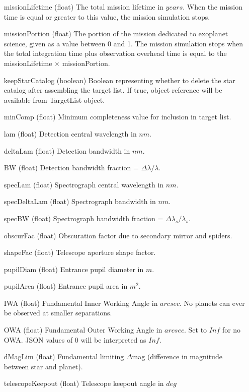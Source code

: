 \documentclass[cleanfoot]{asme2ej}
\begin{document}
\begin{itemize}[leftmargin=1in,font={\ttfamily}]
\item[missionLifetime] (float) The total mission lifetime in $ years $.  When the mission time is equal or greater to this value, the mission simulation stops.
\item[missionPortion] (float) The portion of the mission dedicated to exoplanet science, given as a value between 0 and 1. The mission simulation stops when the total integration time plus observation overhead time is equal to the missionLifetime $\times$ missionPortion.
\item[keepStarCatalog] (boolean) Boolean representing whether to delete the star catalog after assembling the target list.  If true, object reference will be available from TargetList object.
\item[minComp] (float) Minimum completeness value for inclusion in target list. 
\item[lam] (float) Detection central wavelength in $ nm $.
\item[deltaLam] (float) Detection bandwidth in $ nm $.
\item[BW] (float) Detection bandwidth fraction = $\Delta\lambda/\lambda$.
\item[specLam] (float) Spectrograph central wavelength in $ nm $.
\item[specDeltaLam] (float) Spectrograph bandwidth in $ nm $.
\item[specBW] (float) Spectrograph bandwidth fraction = $\Delta\lambda_s/\lambda_s$.
\item[obscurFac] (float) Obscuration factor due to secondary mirror and spiders.
\item[shapeFac] (float)  Telescope aperture shape factor.
\item[pupilDiam] (float) Entrance pupil diameter in $m$.
\item[pupilArea] (float) Entrance pupil area in $m^2$.
\item[IWA] (float) Fundamental Inner Working Angle in $ arcsec $. No planets can ever be observed at smaller separations.
\item[OWA] (float) Fundamental Outer Working Angle in $ arcsec $. Set to $ Inf $ for no OWA. JSON values of 0 will be interpreted as $ Inf $.
\item[dMagLim] (float) Fundamental limiting $\Delta$mag (difference in magnitude between star and planet). 
\item[telescopeKeepout] (float) Telescope keepout angle in $ deg $

\end{itemize}
\end{document}

